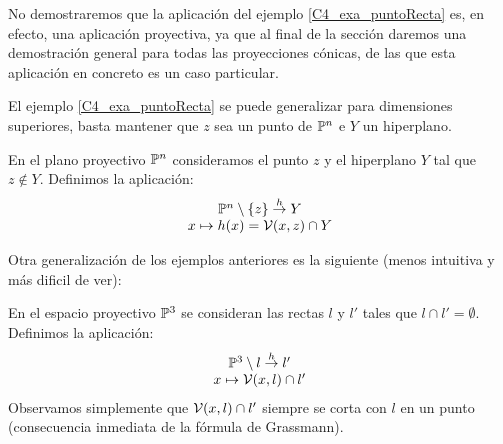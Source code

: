 No demostraremos que la aplicación del ejemplo \ref{C4_exa_puntoRecta} es, en efecto, una aplicación proyectiva, ya que al final de la sección daremos una demostración general para todas las proyecciones cónicas, de las que esta aplicación en concreto es un caso particular.

El ejemplo \ref{C4_exa_puntoRecta} se puede generalizar para dimensiones superiores, basta mantener que $z$ sea un punto de $\mathbb{P}^n$ e $Y$ un hiperplano.
\begin{exa}
	\label{C4_exa_puntoHiperplano}
	En el plano proyectivo $\mathbb{P}^n$ consideramos el punto $z$ y el hiperplano $Y$ tal que $z\not\in Y$. Definimos la aplicación:
	\[\begin{array}{c}
	\mathbb{P}^n\setminus\{z\}\stackrel{h}{\to} Y\\
	x\mapsto h(x)=\mathcal{V}(x,z)\cap Y
	\end{array}\]
\end{exa}
Otra generalización de los ejemplos anteriores es la siguiente (menos intuitiva y más dificil de ver):
\begin{exa}
	En el espacio proyectivo $\mathbb{P}^3$ se consideran las rectas $l$ y $l'$ tales que $l\cap l'=\emptyset$. Definimos la aplicación:
	\[\begin{array}{c}
	\mathbb{P}^3\setminus l\stackrel{h}{\to}l'\\
	x\mapsto\mathcal{V}(x,l)\cap l'
	\end{array}\]
	Observamos simplemente que $\mathcal{V}(x,l)\cap l'$ siempre se corta con $l$ en un punto (consecuencia inmediata de la fórmula de Grassmann).
\end{exa}

